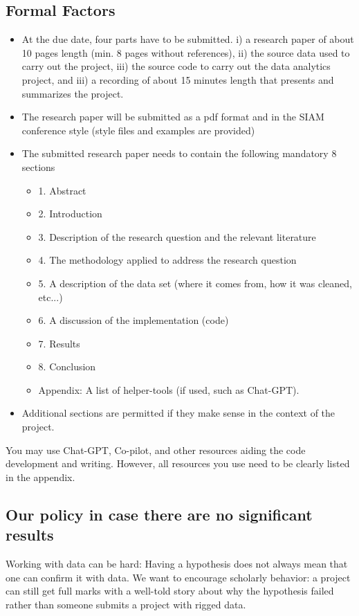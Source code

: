 \documentclass[12pt]{article} %
\begin{document}
\subsection{Formal Factors}

\begin{itemize}
 \item At the due date, four parts have to be submitted. i) a research paper of about 10 pages length (min. 8 pages without references), ii) the source data used to carry out the project, iii) the source code to carry out the data analytics project, and iii) a recording of about 15 minutes length that presents and summarizes the project.
 \item The research paper will be submitted as a pdf format 
 and in the SIAM conference style (style files and examples are provided)
 \item The submitted research paper needs to contain the following mandatory 8 sections
 \begin{itemize}
  \item 1. Abstract
  \item 2. Introduction
  \item 3. Description of the research question and the relevant literature
  \item 4. The methodology applied to address the research question
  \item 5. A description of the data set (where  
 it comes from, how it was cleaned, etc...)
 \item 6. A discussion of the implementation (code)
 \item 7. Results
 \item 8. Conclusion
 \item Appendix: A list of helper-tools (if used, such as Chat-GPT).
 \end{itemize}


 \item Additional sections are permitted if they make sense in the context of the project.
\end{itemize}

You may use Chat-GPT, Co-pilot, and other resources aiding the code development and writing. However, all resources you use need to be clearly listed in the appendix.



\subsection{Our policy in case there are no significant results}

Working with data can be hard: 
Having a hypothesis does not always mean that one can confirm it with data.
We want to encourage scholarly behavior: a project can still get full marks with 
a well-told story about why the hypothesis failed rather than someone submits a project
with rigged data.







% 
\end{document}
